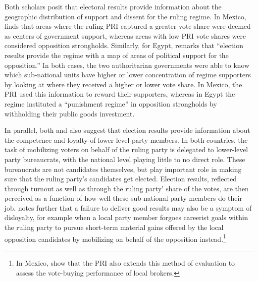 \documentclass[12pt]{article}\usepackage[]{graphicx}\usepackage[]{color}
\newcommand{\1}{\mathbbm{1}}
\begin{document}
Both scholars posit that electoral results provide information about the geographic distribution of support and dissent for the ruling regime. In Mexico, \cite{Magaloni2006} finds that areas where the ruling PRI captured a greater vote share were deemed as centers of government support, whereas areas with low PRI vote shares were considered opposition strongholds. Similarly, for Egypt, \cite{Blaydes2008} remarks that “election results provide the regime with a map of areas of political support for the opposition.” In both cases, the two authoritarian governments were able to know which sub-national units have higher or lower concentration of regime supporters by looking at where they received a higher or lower vote share. In Mexico, the PRI used this information to reward their supporters, whereas in Egypt the regime instituted a “punishment regime” in opposition strongholds by withholding their public goods investment.

In parallel, both \cite{Magaloni2006} and \cite{Blaydes2008} also suggest that election results provide information about the competence and loyalty of lower-level party members. In both countries, the task of mobilizing voters on behalf of the ruling party is delegated to lower-level party bureaucrats, with the national level playing little to no direct role. These bureaucrats are not candidates themselves, but play important role in making sure that the ruling party’s candidates get elected. Election results, reflected through turnout as well as through the ruling party' share of the votes, are then perceived as a function of how well these sub-national party members do their job. \cite{Blaydes2008} notes further that a failure to deliver good results may also be a symptom of disloyalty, for example when a local party member forgoes careerist goals within the ruling party to pursue short-term material gains offered by the local opposition candidates by mobilizing on behalf of the opposition instead.\footnote{In Mexico, \cite{Larreguy2016} show that the PRI also extends this method of evaluation to assess the vote-buying performance of local brokers.}
\end{document}
